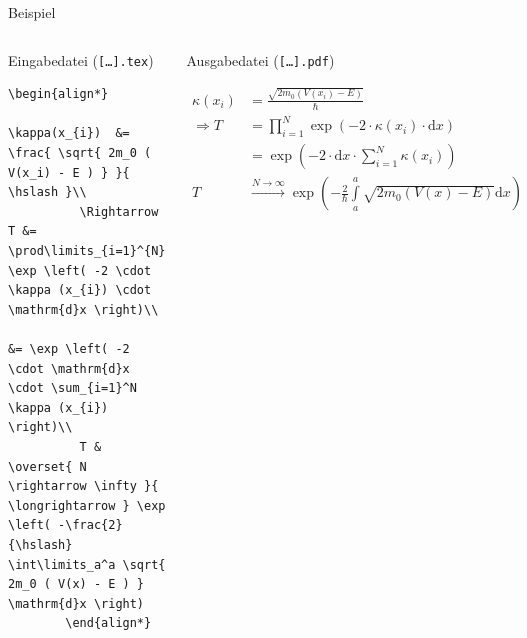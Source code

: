 \begin{frame}[fragile,t]{Beispiel}
  \begin{columns}[t]
    \begin{block}{Eingabedatei (\texttt{[\ldots].tex})}
      \begin{lstlisting}[gobble=8]
        \begin{align*}
          \kappa(x_{i})  &= \frac{ \sqrt{ 2m_0 ( V(x_i) - E ) } }{ \hslash }\\
          \Rightarrow T &= \prod\limits_{i=1}^{N} \exp \left( -2 \cdot \kappa (x_{i}) \cdot \mathrm{d}x \right)\\
                         &= \exp \left( -2 \cdot \mathrm{d}x \cdot \sum_{i=1}^N \kappa (x_{i}) \right)\\
          T & \overset{ N \rightarrow \infty }{ \longrightarrow } \exp \left( -\frac{2}{\hslash} \int\limits_a^a \sqrt{ 2m_0 ( V(x) - E ) } \mathrm{d}x \right)
        \end{align*}
      \end{lstlisting}
    \end{block}
    \begin{block}{Ausgabedatei (\texttt{[\ldots].pdf})}
      \begin{outputbox}
        \small
        \begin{align*}
          \kappa(x_{i})  &=\frac{ \sqrt{2m_0(V(x_i)-E)} }{\hslash}\\
          \Rightarrow T &=\prod\limits_{i=1}^{N} \exp\left(-2\cdot\kappa(x_{i})\cdot\mathrm{d}x\right)\\
                        &=\exp\left(-2\cdot\mathrm{d}x\cdot\sum_{i=1}^N\kappa(x_{i})\right)\\
          T&\overset{N\rightarrow\infty}{\longrightarrow}\exp\left(-\frac{2}{\hslash}\int\limits_a^a\sqrt{2m_0(V(x)-E)}\mathrm{d}x\right)
        \end{align*}
        \normalsize
      \end{outputbox}
    \end{block}
  \end{columns}
\end{frame}


